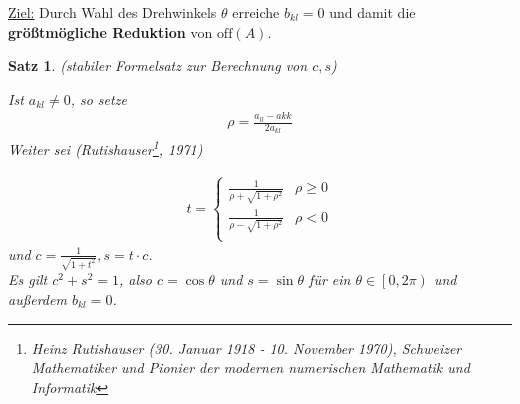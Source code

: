 \documentclass[%
a4paper,
11pt,		%
]
{scrartcl}
\newcommand{\off}{\text{off}}
\theoremstyle{plain}
\theoremstyle{plain}
\newtheorem{mysatz}[mydef]{Satz}
\theoremstyle{plain}
\theoremstyle{plain}
\begin{document}
\uline{Ziel:} Durch Wahl des Drehwinkels $\theta$ erreiche $b_{kl}=0$ und damit die \textbf{größtmögliche Reduktion} von $\off(A)$.

\begin{mysatz}\label{satz:stabilerFormelsatzcs}
(stabiler Formelsatz zur Berechnung von $c,s$)

Ist $a_{kl} \neq 0$, so setze
\begin{align*}
\rho = \frac{a_{ll}-a{kk}}{2a_{kl}}
\end{align*}
Weiter sei (Rutishauser\footnote{Heinz Rutishauser (30. Januar 1918 - 10. November 1970), Schweizer Mathematiker und Pionier der modernen numerischen Mathematik und Informatik}, 1971)
 
\begin{align*}
t = 
\begin{cases}
\frac{1}{\rho + \sqrt{1+\rho^2}} & \rho \geq 0\\
\frac{1}{\rho - \sqrt{1+\rho^2}} & \rho < 0\\
\end{cases}
\end{align*}
und $c = \frac{1}{\sqrt{1+t^2}}, s=t \cdot  c$.\\

Es gilt $c^2 + s^2 = 1$, also $c = \cos \theta$ und  $s = \sin \theta$ für ein $\theta \in \left[0,2 \pi \right)$ und außerdem $b_{kl} = 0$.


\end{mysatz}
\end{document}

